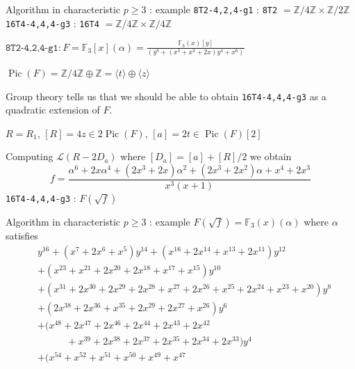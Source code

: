 \documentclass[xcolor=dvipsnames]{beamer}
\theoremstyle{plain}
\newcommand{\ZZ}{\mathbb Z}
\newcommand{\FF}{\mathbb{F}}
\DeclareMathOperator{\Pic}{Pic}
\begin{document}
{    \begin{frame}{Algorithm in characteristic $p\geq 3$ : example}
      \texttt{8T2-4,2,4-g1} : \texttt{8T2} $=\ZZ/4\ZZ\times\ZZ/2\ZZ$
      \newline
      \texttt{16T4-4,4,4-g3} : \texttt{16T4} $=\ZZ/4\ZZ\times\ZZ/4\ZZ$
      \pause\par
      $\texttt{8T2-4,2,4-g1} : F = \FF_3[x](\alpha)=\frac{\FF_3(x)[y]}{(y^8 + (x^3 + x^2 + 2x)y^4 + x^6)}$
      \pause\par
      $\Pic(F) = \ZZ/4\ZZ\oplus\ZZ =
      \langle t\rangle\oplus\langle z\rangle$
      \pause\par
      Group theory tells us that we should be able to obtain
      \texttt{16T4-4,4,4-g3} as a quadratic extension
      of $F$.
      \pause\par
      $R = R_1$, $[R] = 4z\in 2\Pic(F)$, $[a]=2t\in\Pic(F)[2]$
      \pause\par
      Computing $\mathscr{L}(R-2D_a)$ where
      $[D_a] = [a]+[R]/2$ we obtain
      \[
        f = \frac{\alpha^6 + 2x\alpha^4 + (2x^3 + 2x)\alpha^2 + (2x^3 + 2x^2)\alpha + x^4 + 2x^3}{x^3(x+1)}
      \]
      \pause
      \texttt{16T4-4,4,4-g3} : $F(\sqrt{f})$
    \end{frame}
    \begin{frame}{Algorithm in characteristic $p\geq 3$ : example}
      $F(\sqrt{f}) = \FF_3(x)(\alpha)$ where $\alpha$ satisfies
      \begin{align*}
        &y^{16} + (x^7 + 2x^6 + x^5)y^{14} + (x^{16} + 2x^{14} + x^{13} + 2x^{11})y^{12}\\
        &+ (x^{23} + x^{21} + 2x^{20} + 2x^{18} + x^{17} + x^{15})y^{10}\\
        &+ (x^{31} + 2x^{30} + 2x^{29} + 2x^{28} + x^{27} + 2x^{26} + x^{25} + 2x^{24} + x^{23} + x^{20})y^8\\
        &+ (2x^{38} + 2x^{36} + x^{35} + 2x^{29} + 2x^{27} + x^{26})y^6\\
        &+ (x^{48} + 2x^{47} + 2x^{46} + 2x^{44} + 2x^{43} + 2x^{42}\\
        &\;\;\;\;\;\;\;\;\;\;\,+x^{39} + 2x^{38} + 2x^{37} + 2x^{35} + 2x^{34} + 2x^{33})y^4\\
        &+ (x^{54} + x^{52} + x^{51} + x^{50} + x^{49} + x^{47}\\

\end{align*}
\end{frame}}
\end{document}
